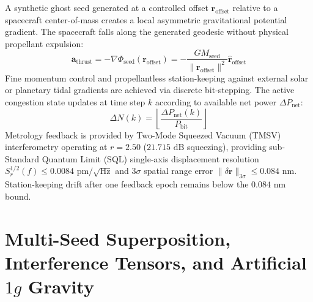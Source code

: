\documentclass[twocolumn,aps,pra,floatfix,superscriptaddress,10pt]{revtex4-2}
\begin{document}
A synthetic ghost seed generated at a controlled offset $\mathbf{r}_{\text{offset}}$ relative to a spacecraft center-of-mass creates a local asymmetric gravitational potential gradient. The spacecraft falls along the generated geodesic without physical propellant expulsion:
\begin{equation}
\mathbf{a}_{\text{thrust}} = -\nabla \Phi_{\text{seed}}(\mathbf{r}_{\text{offset}}) = -\frac{G M_{\text{seed}}}{\|\mathbf{r}_{\text{offset}}\|^2} \hat{\mathbf{r}}_{\text{offset}}
\end{equation}
Fine momentum control and propellantless station-keeping against external solar or planetary tidal gradients are achieved via discrete bit-stepping. The active congestion state updates at time step $k$ according to available net power $\Delta P_{\text{net}}$:
\begin{equation}
\Delta N(k) = \left\lfloor \frac{\Delta P_{\text{net}}(k)}{P_{\text{bit}}} \right\rfloor
\end{equation}
Metrology feedback is provided by Two-Mode Squeezed Vacuum (TMSV) interferometry operating at $r = 2.50$ ($21.715\text{ dB}$ squeezing), providing sub-Standard Quantum Limit (SQL) single-axis displacement resolution $S_r^{1/2}(f) \le 0.0084\text{ pm}/\sqrt{\text{Hz}}$ and $3\sigma$ spatial range error $\|\delta\mathbf{r}\|_{3\sigma} \le 0.084\text{ nm}$. Station-keeping drift after one feedback epoch remains below the $0.084\text{ nm}$ bound.

\section{Multi-Seed Superposition, Interference Tensors, and Artificial \texorpdfstring{$1g$}{1g} Gravity}
\end{document}
